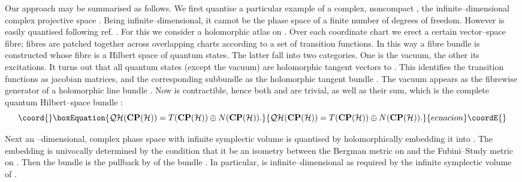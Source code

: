 \documentclass[a4paper,a4paper]{article}
\begin{document}
Our approach may be summarised as follows. We first quantise a particular example of a complex, 
noncompact \coordHE{}, the infinite--dimensional complex projective space \coordHE{}. 
Being infinite--dimensional, it cannot be the phase space of a finite number of degrees of freedom. 
However \coordHE{} is easily quantised following ref. \cite{PQM}. For this
we consider a holomorphic atlas on \coordHE{}. Over each coordinate chart 
we erect a certain vector--space fibre; fibres are patched together across overlapping charts 
according to a set of transition functions. In this way a fibre bundle is constructed whose fibre 
is a Hilbert space of quantum states. The latter fall into two categories. 
One is the vacuum, the other its excitations. 
It turns out that all quantum states (except the vacuum) are holomorphic tangent vectors 
to \coordHE{}. This identifies the transition functions as jacobian matrices, 
and the corresponding subbundle as the holomorphic tangent bundle \coordHE{}. 
The vacuum \myHighlight{$\vert 0\rangle$}\coordHE{} appears as the fibrewise generator of a holomorphic line bundle 
\coordHE{}. Now \coordHE{} is contractible, hence both 
\coordHE{} and \coordHE{} are trivial, as well as their sum, which is 
the complete quantum Hilbert--space bundle \coordHE{}:
\begin{equation}\coord{}\boxEquation{
{\cal QH}({\bf CP}({\cal H}))=T({\bf CP}({\cal H}))\oplus N({\bf CP}({\cal H})).
\label{compelto}
}{
{\cal QH}({\bf CP}({\cal H}))=T({\bf CP}({\cal H}))\oplus N({\bf CP}({\cal H})).
}{ecuacion}\coordE{}\end{equation}

Next an \coordHE{}--dimensional, complex phase space \coordHE{} with infinite symplectic 
volume is quantised by holomorphically embedding it into \coordHE{}. The embedding \coordHE{} 
is univocally determined by the condition that it be an isometry between 
the Bergman metric on \coordHE{} and the Fubini--Study metric on \coordHE{}. 
Then the bundle \coordHE{} is the pullback by \myHighlight{$\iota$}\coordHE{} of the 
bundle \coordHE{}. 
In particular, \coordHE{} is infinite--dimensional as required by the 
infinite symplectic volume of \coordHE{}.
\end{document}
